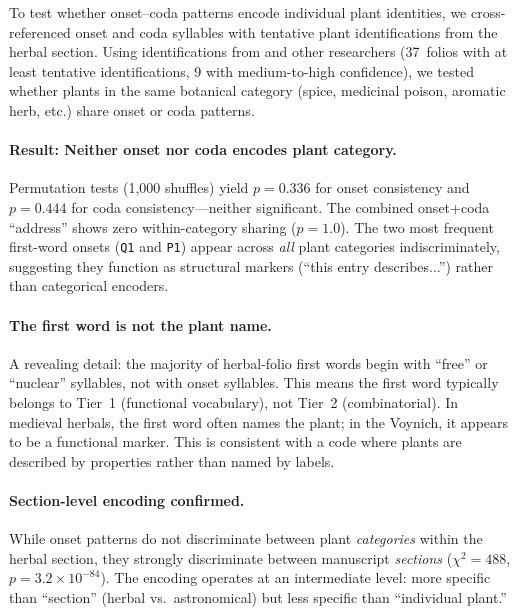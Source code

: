 To test whether onset--coda patterns encode individual plant identities, we cross-referenced onset and coda syllables with tentative plant identifications from the herbal section.  Using identifications from \citet{bax2014} and other researchers (37~folios with at least tentative identifications, 9 with medium-to-high confidence), we tested whether plants in the same botanical category (spice, medicinal poison, aromatic herb, etc.) share onset or coda patterns.

\paragraph{Result: Neither onset nor coda encodes plant category.}
Permutation tests (1,000 shuffles) yield $p = 0.336$ for onset consistency and $p = 0.444$ for coda consistency---neither significant.  The combined onset+coda ``address'' shows zero within-category sharing ($p = 1.0$).  The two most frequent first-word onsets (\texttt{Q1} and \texttt{P1}) appear across \emph{all} plant categories indiscriminately, suggesting they function as structural markers (``this entry describes...'') rather than categorical encoders.

\paragraph{The first word is not the plant name.}
A revealing detail: the majority of herbal-folio first words begin with ``free'' or ``nuclear'' syllables, not with onset syllables.  This means the first word typically belongs to Tier~1 (functional vocabulary), not Tier~2 (combinatorial).  In medieval herbals, the first word often names the plant; in the Voynich, it appears to be a functional marker.  This is consistent with a code where plants are described by properties rather than named by labels.

\paragraph{Section-level encoding confirmed.}
While onset patterns do not discriminate between plant \emph{categories} within the herbal section, they strongly discriminate between manuscript \emph{sections} ($\chi^2 = 488$, $p = 3.2 \times 10^{-84}$).  The encoding operates at an intermediate level: more specific than ``section'' (herbal vs.\ astronomical) but less specific than ``individual plant.''

